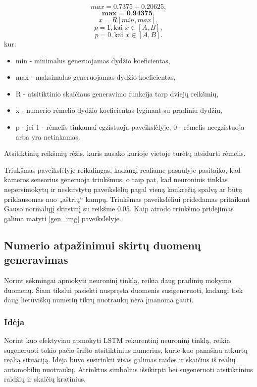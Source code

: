 \documentclass{VUMIFInfBakalaurinis}
\begin{document}
\begin{equation*}
  max = 0.7375 + 0.20625,
\end{equation*}
\begin{equation*}
  \textbf{max = 0.94375},
\end{equation*}
\begin{equation*}
  x = R[min, max],
\end{equation*}
\begin{equation*}
  p = 1, \text{kai } x \in [A, B],
\end{equation*}
\begin{equation*}
  p = 0, \text{kai } x \in [A, B].
\end{equation*}
kur:
\begin{itemize}[itemsep=0.5pt]
  \item min - minimalus generuojamas dydžio koeficientas,
  \item max - maksimalus generuojamas dydžio koeficientas,
  \item R - atsitiktinio skaičiaus generavimo funkcija tarp dviejų reikšmių,
  \item x - numerio rėmelio dydžio koeficientas lyginant su pradiniu dydžiu,
  \item p - jei 1 - rėmelis tinkamai egzistuoja paveikslėlyje, 0 - rėmelis neegzistuoja arba yra netinkamas.
\end{itemize}

Atsitiktinių reikšmių rėžis, kuris nusako kurioje vietoje turėtų atsidurti rėmelis.

Triukšmas paveikslėlyje reikalingas, kadangi realiame pasaulyje pasitaiko, kad kameros sensorius generuoja triukšmus, o taip pat,
kad neuroninis tinklas nepersimokytų ir neskirstytų paveikslėlių pagal vieną konkrečią spalvą ar būtų priklausomas nuo „aštrių“ kampų.
Triukšmas paveikslėliui pridedamas pritaikant Gauso normalųjį skirstinį su reikšme 0.05.
Kaip atrodo triukšmo pridėjimas galima matyti \ref{gen_img} paveikslėlyje.

\subsection{Numerio atpažinimui skirtų duomenų generavimas}
Norint sėkmingai apmokyti neuroninį tinklą, reikia daug pradinių mokymo duomenų. Šiam tikslui pasiekti nuspręsta duomenis susigeneruoti, kadangi tiek daug lietuviškų numerių
tikrų nuotraukų nėra įmanoma gauti. 

\subsubsection{Idėja}
Norint kuo efektyviau apmokyti LSTM rekurentinį neuroninį tinklą, reikia sugeneruoti tokio pačio šrifto atsitiktinius numerius, kurie kuo panašiau atkurtų realią situaciją. 
Idėja buvo susirinkti visas galimas raides ir skaičius iš realių automobilių nuotraukų. Atrinktus simbolius išsikirpti bei sugeneruoti atsitiktinius raidžių ir skaičių kratinius.
\end{document}
